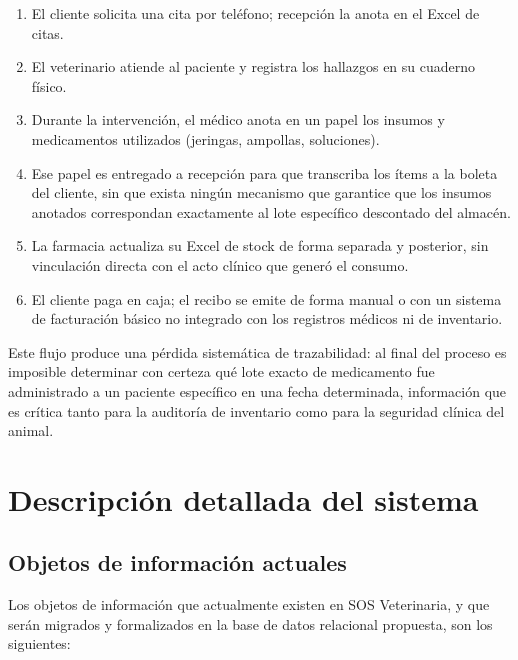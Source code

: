 \begin{enumerate}
	\item El cliente solicita una cita por teléfono; recepción la anota en el Excel de citas.
	\item El veterinario atiende al paciente y registra los hallazgos en su cuaderno físico.
	\item Durante la intervención, el médico anota en un papel los insumos y medicamentos utilizados (jeringas, ampollas, soluciones).
	\item Ese papel es entregado a recepción para que transcriba los ítems a la boleta del cliente, sin que exista ningún mecanismo que garantice que los insumos anotados correspondan exactamente al lote específico descontado del almacén.
	\item La farmacia actualiza su Excel de stock de forma separada y posterior, sin vinculación directa con el acto clínico que generó el consumo.
	\item El cliente paga en caja; el recibo se emite de forma manual o con un sistema de facturación básico no integrado con los registros médicos ni de inventario.
\end{enumerate}

Este flujo produce una pérdida sistemática de trazabilidad: al final del proceso es imposible determinar con certeza qué lote exacto de medicamento fue administrado a un paciente específico en una fecha determinada, información que es crítica tanto para la auditoría de inventario como para la seguridad clínica del animal.

\section{Descripción detallada del sistema}

\subsection{Objetos de información actuales}

Los objetos de información que actualmente existen en SOS Veterinaria, y que serán migrados y formalizados en la base de datos relacional propuesta, son los siguientes:

